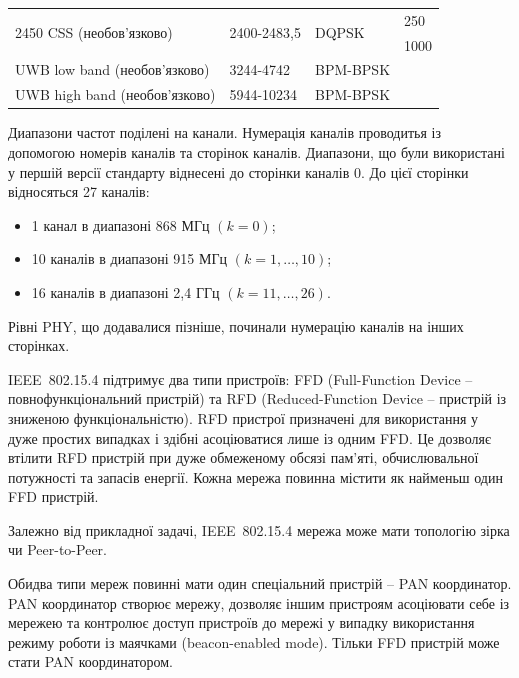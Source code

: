 \documentclass[a4paper,ukrainian,utf8,nocolumnsxix,floatsection,equationsection]{eskdtext}
\newcommand{\iee}[0]{IEEE~802.15.4\xspace}
\begin{document}
\begin{table}[htbp]
\begin{tabular}{|p{}|p{}|p{}|p{}|}
		\multirow{2}{*}{2450 CSS (необов’язково)} & \multirow{2}{*}{2400-2483,5} & \multirow{2}{*}{DQPSK} & 250                         \\ \cline{ 4- 4}
		                                          &                              &                        & 1000                        \\ \hline
		UWB low band (необов’язково)              & 3244-4742                    & BPM-BPSK               &                             \\ \hline
		UWB high band (необов’язково)             & 5944-10234                   & BPM-BPSK               &                             \\ \hline
	\end{tabular}
	\label{tbl:supported:phy:iee}
\end{table}


Диапазони частот поділені на канали. Нумерація каналів проводитья із допомогою номерів каналів та сторінок каналів. Диапазони, що були використані у першій версії стандарту віднесені до сторінки каналів 0. До цієї сторінки відносяться 27 каналів: 
\begin{itemize}
	\item 1 канал в диапазоні 868 МГц $(k = 0)$;
	\item 10 каналів в диапазоні 915 МГц $(k = 1, \dots, 10)$;
	\item 16 каналів в диапазоні 2,4 ГГц $(k = 11, \dots, 26)$.
\end{itemize}

Рівні PHY, що додавалися пізніше, починали нумерацію каналів на інших сторінках.

\iee підтримує два типи пристроїв: FFD (Full-Function Device – повнофункціональний пристрій) та RFD (Reduced-Function Device – пристрій із зниженою функціональністю). RFD пристрої призначені для використання у дуже простих випадках і здібні асоціюватися лише із одним FFD. Це дозволяє втілити RFD пристрій при дуже обмеженому обсязі пам’яті, обчислювальної потужності та запасів енергії. Кожна мережа повинна містити як найменьш один FFD пристрій. 

Залежно від прикладної задачі, \iee мережа може мати топологію зірка чи Peer-to-Peer. 

Обидва типи мереж повинні мати один спеціальний пристрій – PAN координатор. PAN координатор створює мережу, дозволяє іншим пристроям асоціювати себе із мережею та контролює доступ пристроїв до мережі у випадку використання режиму роботи із маячками (beacon-enabled mode). Тільки FFD пристрій може стати PAN координатором.
\end{document}
